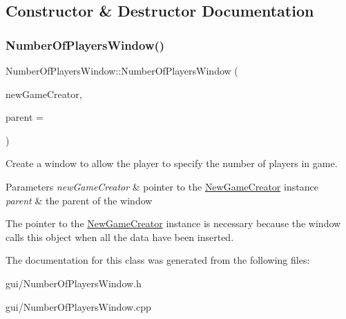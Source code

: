 \subsection{Constructor \& Destructor Documentation}
\mbox{\label{classNumberOfPlayersWindow_a522ce7de553a78ef1514cc988abb8d38}} 
\subsubsection{\texorpdfstring{Number\+Of\+Players\+Window()}{NumberOfPlayersWindow()}}
{\footnotesize\ttfamily Number\+Of\+Players\+Window\+::\+Number\+Of\+Players\+Window (\begin{DoxyParamCaption}\item[{\hyperlink{classNewGameCreator}{New\+Game\+Creator} $\ast$}]{new\+Game\+Creator,  }\item[{Q\+Widget $\ast$}]{parent = {} }\end{DoxyParamCaption})\hspace{0.3cm}{\ttfamily [explicit]}}



Create a window to allow the player to specify the number of players in game. 


\begin{DoxyParams}{Parameters}
{\em new\+Game\+Creator} & pointer to the \hyperlink{classNewGameCreator}{New\+Game\+Creator} instance \\
\hline
{\em parent} & the parent of the window\\
\hline
\end{DoxyParams}
The pointer to the \hyperlink{classNewGameCreator}{New\+Game\+Creator} instance is necessary because the window calls this object when all the data have been inserted. 

The documentation for this class was generated from the following files\+:\begin{DoxyCompactItemize}
\item 
gui/Number\+Of\+Players\+Window.\+h\item 
gui/Number\+Of\+Players\+Window.\+cpp\end{DoxyCompactItemize}
